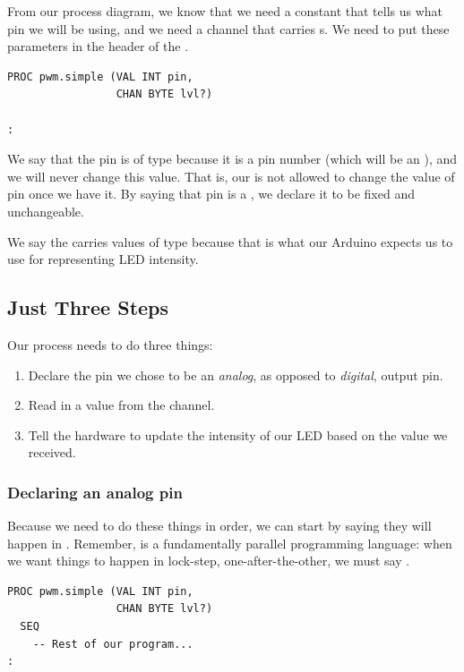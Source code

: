 From our process diagram, we know that we need a constant that tells us what pin we will be using, and we need a channel that carries  {\BYTE}s. We need to put these parameters in the header of the \PROC.

\vspace{3mm}
\begin{lstlisting}
PROC pwm.simple (VAL INT pin, 
                 CHAN BYTE lvl?)

:
\end{lstlisting}
 
We say that the {\code pin} is of type \VALINT because it is a pin number (which will be an \INTeger), and we will never change this value. That is, our \PROC is not allowed to change the value of {\code pin} once we have it. By saying that {\code pin} is a \VAL, we declare it to be fixed and unchangeable.

We say the \CHANnel carries values of type \BYTE because that is what our Arduino expects us to use for representing LED intensity.

\newpage

\subsection{Just Three Steps}
Our process needs to do three things:
\begin{enumerate}
	\item Declare the pin we chose to be an {\em analog}, as opposed to {\em digital}, output pin.
	\item Read in a value from the channel.
	\item Tell the hardware to update the intensity of our LED based on the value we received.
\end{enumerate}

\subsubsection{Declaring an analog pin} 

Because we need to do these things in order, we can start by saying they will happen in \SEQuence. Remember, \occam is a fundamentally parallel programming language: when we want things to happen in lock-step, one-after-the-other, we must say \SEQ.

\vspace{3mm}
\begin{lstlisting}
PROC pwm.simple (VAL INT pin, 
                 CHAN BYTE lvl?)
  SEQ
    -- Rest of our program...
:
\end{lstlisting}

